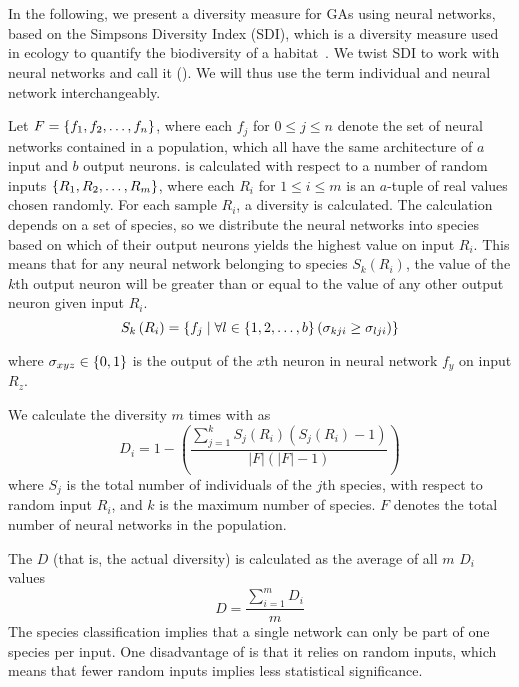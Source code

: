 \section{\di{}}
In the following, we present a diversity measure for GAs using neural networks, based on the Simpsons Diversity Index (SDI), which is a diversity measure used in ecology to quantify the biodiversity of a habitat~\cite{simpson1949measurement}. We twist SDI to work with neural networks and call it \di{} (\dia{}). We will thus use the term individual and neural network interchangeably.

Let $F = \left\{ f_1, f_2, \dots, f_n \right\}$, where each $f_j$ for $0 \leq j \leq n$ denote the set of neural networks contained in a population, which all have the same architecture of $a$ input and $b$ output neurons. \dia{} is calculated with respect to a number of random inputs $\left\{ R_1, R_2, \dots, R_m \right\}$, where each $R_i$ for $1 \leq i \leq m$ is an $a$-tuple of real values chosen randomly. For each sample $R_i$, a diversity is calculated. The calculation depends on a set of species, so we distribute the neural networks into species based on which of their output neurons yields the highest value on input $R_i$. This means that for any neural network belonging to species $S_k(R_i)$, the value of the $k$th output neuron will be greater than or equal to the value of any other output neuron given input $R_i$.%
%
\begin{equation*}\label{eq:species}
  S_k\left(R_i\right) = \left\{ f_j \mid \forall l \in \left\{ 1, 2, \dots, b \right\} \left(\sigma_{kji} \geq \sigma_{lji}\right) \right\}
\end{equation*}
%

where $\sigma_{xyz} \in \left\{ 0, 1 \right\}$ is the output of the $x$th neuron in neural network $f_y$ on input $R_z$.

We calculate the diversity $m$ times with \dia{} as
%
\begin{equation*}\label{eq:sdi}
  D_i = 1 - \left(\frac{\sum_{j=1}^{k}S_j\left(R_i\right)\left(S_j\left(R_i\right) - 1\right)}{\lvert F\rvert \left(\lvert F\rvert - 1\right)}\right) 
\end{equation*}
%
where $S_j$ is the total number of individuals of the $j$th species, with respect to random input $R_i$, and $k$ is the maximum number of species. $F$ denotes the total number of neural networks in the population. 

The \dia{} $D$ (that is, the actual diversity) is calculated as the average of all $m$ $D_i$ values
%
\[D =\frac{\sum_{i=1}^m{D_i}}{m}\]
%
The species classification implies that a single network can only be part of one species per input. One disadvantage of \dia{} is that it relies on random inputs, which means that fewer random inputs implies less statistical significance.
